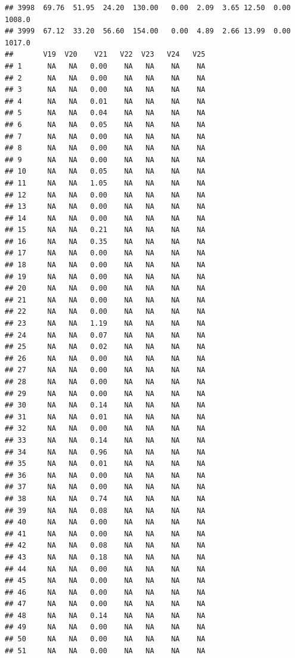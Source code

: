 \documentclass{article}\usepackage{graphicx, color}
\makeatletter
\newenvironment{kframe}{%
 \def\at@end@of@kframe{}%
 \ifinner\ifhmode%
  \def\at@end@of@kframe{\end{minipage}}%
  \begin{minipage}{\columnwidth}%
 \fi\fi%
 \def\FrameCommand##1{\hskip\@totalleftmargin \hskip-\fboxsep
 \colorbox{shadecolor}{##1}\hskip-\fboxsep
     \hskip-\linewidth \hskip-\@totalleftmargin \hskip\columnwidth}%
 \MakeFramed {\advance\hsize-\width
   \@totalleftmargin\z@ \linewidth\hsize
   \@setminipage}}%
 {\par\unskip\endMakeFramed%
 \at@end@of@kframe}
\newenvironment{knitrout}{}{} %
\makeatother
\begin{document}
\begin{knitrout}
\begin{kframe}
\begin{verbatim}
## 3998  69.76  51.95  24.20  130.00   0.00  2.09  3.65 12.50  0.00 1008.0
## 3999  67.12  33.20  56.60  154.00   0.00  4.89  2.66 13.99  0.00 1017.0
##       V19  V20    V21   V22  V23   V24   V25
## 1      NA   NA   0.00    NA   NA    NA    NA
## 2      NA   NA   0.00    NA   NA    NA    NA
## 3      NA   NA   0.00    NA   NA    NA    NA
## 4      NA   NA   0.01    NA   NA    NA    NA
## 5      NA   NA   0.04    NA   NA    NA    NA
## 6      NA   NA   0.05    NA   NA    NA    NA
## 7      NA   NA   0.00    NA   NA    NA    NA
## 8      NA   NA   0.00    NA   NA    NA    NA
## 9      NA   NA   0.00    NA   NA    NA    NA
## 10     NA   NA   0.05    NA   NA    NA    NA
## 11     NA   NA   1.05    NA   NA    NA    NA
## 12     NA   NA   0.00    NA   NA    NA    NA
## 13     NA   NA   0.00    NA   NA    NA    NA
## 14     NA   NA   0.00    NA   NA    NA    NA
## 15     NA   NA   0.21    NA   NA    NA    NA
## 16     NA   NA   0.35    NA   NA    NA    NA
## 17     NA   NA   0.00    NA   NA    NA    NA
## 18     NA   NA   0.00    NA   NA    NA    NA
## 19     NA   NA   0.00    NA   NA    NA    NA
## 20     NA   NA   0.00    NA   NA    NA    NA
## 21     NA   NA   0.00    NA   NA    NA    NA
## 22     NA   NA   0.00    NA   NA    NA    NA
## 23     NA   NA   1.19    NA   NA    NA    NA
## 24     NA   NA   0.07    NA   NA    NA    NA
## 25     NA   NA   0.02    NA   NA    NA    NA
## 26     NA   NA   0.00    NA   NA    NA    NA
## 27     NA   NA   0.00    NA   NA    NA    NA
## 28     NA   NA   0.00    NA   NA    NA    NA
## 29     NA   NA   0.00    NA   NA    NA    NA
## 30     NA   NA   0.14    NA   NA    NA    NA
## 31     NA   NA   0.01    NA   NA    NA    NA
## 32     NA   NA   0.00    NA   NA    NA    NA
## 33     NA   NA   0.14    NA   NA    NA    NA
## 34     NA   NA   0.96    NA   NA    NA    NA
## 35     NA   NA   0.01    NA   NA    NA    NA
## 36     NA   NA   0.00    NA   NA    NA    NA
## 37     NA   NA   0.00    NA   NA    NA    NA
## 38     NA   NA   0.74    NA   NA    NA    NA
## 39     NA   NA   0.08    NA   NA    NA    NA
## 40     NA   NA   0.00    NA   NA    NA    NA
## 41     NA   NA   0.00    NA   NA    NA    NA
## 42     NA   NA   0.08    NA   NA    NA    NA
## 43     NA   NA   0.18    NA   NA    NA    NA
## 44     NA   NA   0.00    NA   NA    NA    NA
## 45     NA   NA   0.00    NA   NA    NA    NA
## 46     NA   NA   0.00    NA   NA    NA    NA
## 47     NA   NA   0.00    NA   NA    NA    NA
## 48     NA   NA   0.14    NA   NA    NA    NA
## 49     NA   NA   0.00    NA   NA    NA    NA
## 50     NA   NA   0.00    NA   NA    NA    NA
## 51     NA   NA   0.00    NA   NA    NA    NA

\end{verbatim}
\end{kframe}
\end{knitrout}
\end{document}
